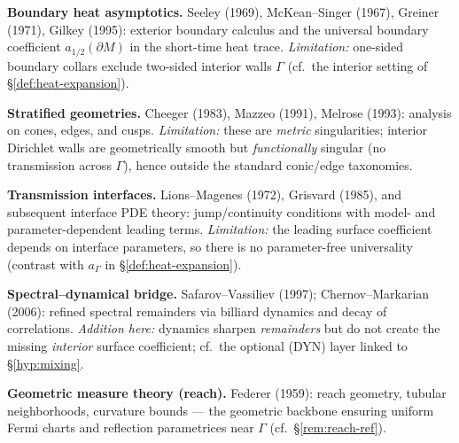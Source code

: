\noindent\textbf{Boundary heat asymptotics.}
Seeley (1969), McKean–Singer (1967), Greiner (1971), Gilkey (1995): exterior boundary calculus and the universal boundary coefficient $a_{1/2}(\partial M)$ in the short-time heat trace.
\emph{Limitation:} one-sided boundary collars exclude two-sided interior walls $\Gamma$ (cf.\ the interior setting of \S\ref{def:heat-expansion}).

\noindent\textbf{Stratified geometries.}
Cheeger (1983), Mazzeo (1991), Melrose (1993): analysis on cones, edges, and cusps.
\emph{Limitation:} these are \emph{metric} singularities; interior Dirichlet walls are geometrically smooth but \emph{functionally} singular (no transmission across $\Gamma$), hence outside the standard conic/edge taxonomies.

\noindent\textbf{Transmission interfaces.}
Lions–Magenes (1972), Grisvard (1985), and subsequent interface PDE theory: jump/continuity conditions with model- and parameter-dependent leading terms.
\emph{Limitation:} the leading surface coefficient depends on interface parameters, so there is no parameter-free universality (contrast with $a_\Gamma$ in \S\ref{def:heat-expansion}).

\noindent\textbf{Spectral–dynamical bridge.}
Safarov–Vassiliev (1997); Chernov–Markarian (2006): refined spectral remainders via billiard dynamics and decay of correlations.
\emph{Addition here:} dynamics sharpen \emph{remainders} but do not create the missing \emph{interior} surface coefficient; cf.\ the optional (DYN) layer linked to \S\ref{hyp:mixing}.

\noindent\textbf{Geometric measure theory (reach).}
Federer (1959): reach geometry, tubular neighborhoods, curvature bounds — the geometric backbone ensuring uniform Fermi charts and reflection parametrices near $\Gamma$ (cf.\ \S\ref{rem:reach-ref}).

\medskip


